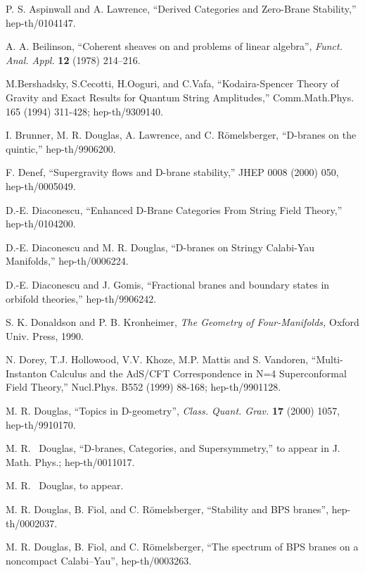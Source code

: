 \documentclass[a4paper,12pt]{amsart}
\numberwithin{equation}{section}
\theoremstyle{plain}
\theoremstyle{definition}
\def\Bbb#1{{\fam\black\relax#1}}
\def\Bbb{\bf}
\def\cal{\mathcal}
\def\BP{\Bbb{P}}
\def\CN{{\cal N}}
\begin{document}
\begin{thebibliography}{10}

P. S. Aspinwall and A. Lawrence,
``Derived Categories and Zero-Brane Stability,''
hep-th/0104147.

A. A. Beilinson, ``Coherent sheaves on \myHighlight{$\BP^n$}\coordHE{} and
  problems of linear algebra'', {\it Funct. Anal. Appl.}
  {\bf 12} (1978) 214--216.

M.Bershadsky, S.Cecotti, H.Ooguri, and C.Vafa,
``Kodaira-Spencer Theory of Gravity and 
Exact Results for Quantum String Amplitudes,''
Comm.Math.Phys. 165 (1994) 311-428; hep-th/9309140.

I. Brunner, M. R. Douglas, A. Lawrence, and C. R\"omelsberger,
  ``D-branes on the quintic,'' hep-th/9906200.

F. Denef, ``Supergravity flows and D-brane stability,''
JHEP 0008 (2000) 050, hep-th/0005049.

D.-E. Diaconescu,
``Enhanced D-Brane Categories From String Field Theory,''
hep-th/0104200.

D.-E. Diaconescu and M. R. Douglas, ``D-branes on Stringy
Calabi-Yau Manifolds,'' hep-th/0006224.

D.-E. Diaconescu and J. Gomis, ``Fractional branes and boundary
  states in orbifold theories,'' hep-th/9906242.

S. K. Donaldson and P. B. Kronheimer, {\it The Geometry
of Four-Manifolds,} Oxford Univ. Press, 1990.

N. Dorey, T.J. Hollowood, V.V. Khoze, M.P. Mattis and S. Vandoren,
``Multi-Instanton Calculus and the AdS/CFT Correspondence 
in N=4 Superconformal Field Theory,''
Nucl.Phys. B552 (1999) 88-168; hep-th/9901128.

M. R. Douglas, ``Topics in D-geometry'',
  {\it Class. Quant. Grav.} {\bf 17} (2000) 1057, hep-th/9910170.

M. R.~ Douglas, ``D-branes, Categories, and \myHighlight{$\CN=1$}\coordHE{} Supersymmetry,''
to appear in J. Math. Phys.; hep-th/0011017.

M. R.~ Douglas, to appear.

M. R. Douglas, B. Fiol, and C. R\"omelsberger,
  ``Stability and BPS branes'', hep-th/0002037.

M. R. Douglas, B. Fiol, and C. R\"omelsberger, 
  ``The spectrum of BPS branes on a noncompact Calabi--Yau'', 
  hep-th/0003263.


\end{thebibliography}
\end{document}
